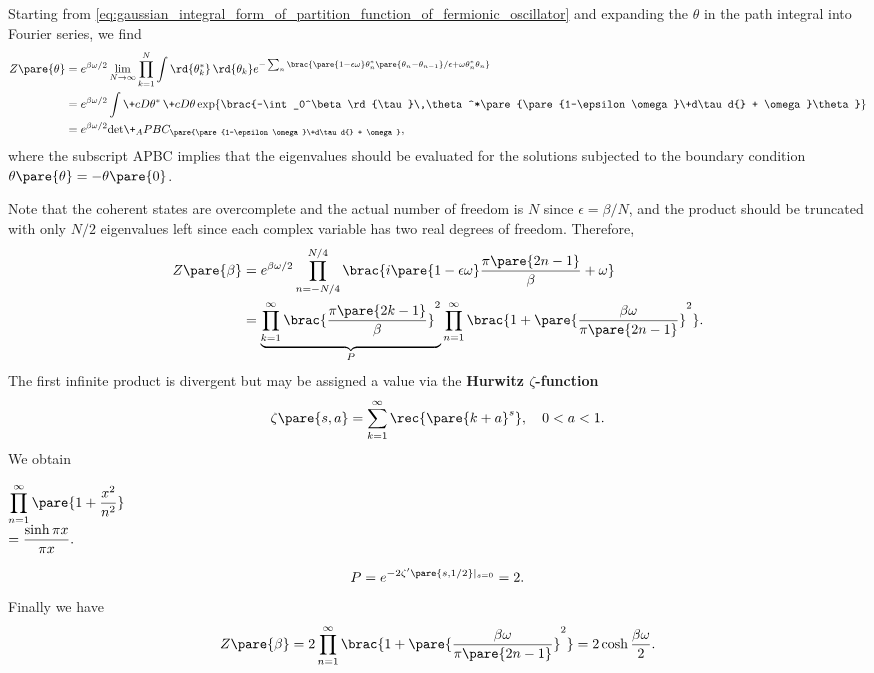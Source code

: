 \documentclass[hidelinks]{article}
\begin{document}
Starting from \eqref{eq:gaussian_integral_form_of_partition_function_of_fermionic_oscillator} and expanding the $\theta$ in the path integral into Fourier series, 
we find
\begin{align*}
    Z\pare{\theta} &= e^{\beta\omega/2}\lim_{N\rightarrow \infty}\prod_{k=1}^N \int \rd{\theta_k^*}\,\rd{\theta_k} e^{-\sum_n\brac{\pare{1-\epsilon\omega}\theta_n^*\pare{\theta_n - \theta_{n-1}}/\epsilon + \omega\theta_n^*\theta_n}} \\
    &= e^{\beta\omega/2}\int \+cD\theta^*\,\+cD\theta \exp\brac{-\int_0^\beta \rd{\tau}\,\theta^*\pare{\pare{1-\epsilon\omega}\+d\tau d{} + \omega}\theta} \\
    &= e^{\beta\omega/2}{\det}\+_APBC_\pare{\pare{1-\epsilon\omega}\+d\tau d{} + \omega},
\end{align*}
where the subscript APBC implies that the eigenvalues should be evaluated for the solutions subjected to the boundary condition $\theta\pare{\theta} = -\theta\pare{0}$.
\par
Note that the coherent states are overcomplete and the actual number of freedom is $N$ since $\epsilon = \beta/N$, and the product should be truncated with only $N/2$ eigenvalues left since each complex variable has two real degrees of freedom. Therefore,
\begin{align*}
    Z\pare{\beta} &= e^{\beta\omega/2}\prod_{n=-N/4}^{N/4}\brac{i\pare{1-\epsilon\omega} \frac{\pi\pare{2n-1}}{\beta} + \omega} \\
    &= \underbrace{\prod_{k=1}^\infty \brac{\frac{\pi\pare{2k-1}}{\beta}}^2}_P \prod_{n=1}^\infty \brac{1+\pare{\frac{\beta\omega}{\pi\pare{2n-1}}}^2}.
\end{align*}
The first infinite product is divergent but may be assigned a value via the \textbf{Hurwitz $\zeta$-function}
\[ \zeta\pare{s,a} = \sum_{k=1}^\infty \rec{\pare{k+a}^s},\quad 0<a<1. \]
We obtain\begin{margintips}
    $\begin{array}{@{}l}
        \displaystyle \prod_{n=1}^\infty \pare{1+\frac{x^2}{n^2}}\\
        \displaystyle  = \frac{\sinh \pi x}{\pi x}.
    \end{array}$
\end{margintips}
\[ P = e^{-2\zeta'\pare{s,1/2}\vert_{s=0}} = 2. \]
Finally we have
\[ Z\pare{\beta} = 2\prod_{n=1}^\infty \brac{1+\pare{\frac{\beta\omega}{\pi\pare{2n-1}}}^2} = 2\cosh \frac{\beta\omega}{2}. \]
\end{document}
